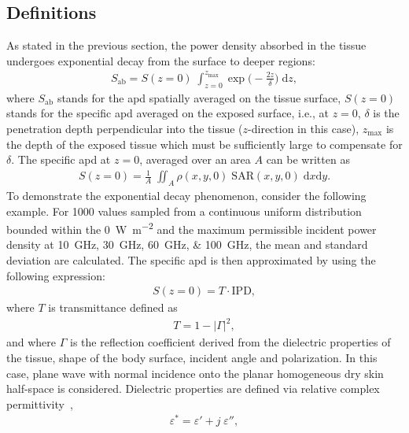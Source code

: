 \subsection{Definitions}
As stated in the previous section, the power density absorbed in the tissue undergoes exponential decay from the surface to deeper regions:
\begin{align}
    \label{eqn:apd}
    S_\text{ab} = S(z=0) \; \int_{z=0}^{z_\text{max}} \exp{ \Big(- \frac{2z}{\delta} \Big)} \; \mathrm{d}z,  
\end{align}
where $S_\text{ab}$ stands for the \gls{apd} spatially averaged on the tissue surface, $S(z=0)$ stands for the specific \gls{apd} averaged on the exposed surface, i.e., at $z=0$, $\delta$ is the penetration depth perpendicular into the tissue ($z$-direction in this case), $z_\text{max}$ is the depth of the exposed tissue which must be sufficiently large to compensate for $\delta$.
The specific \gls{apd} at $z=0$, averaged over an area $A$ can be written as
\begin{align}
    \label{eqn:specific_apd}
    S(z=0) = \frac{1}{A} \; \iint_A \rho(x, y, 0) \; \text{SAR}(x, y, 0) \; \mathrm{d}x \mathrm{d}y.
\end{align}
To demonstrate the exponential decay phenomenon, consider the following example.
For 1000 values sampled from a continuous uniform distribution bounded within the \SI{0}{\watt\per\m\squared} and the maximum permissible incident power density at \SIlist[list-units=single]{10;30;60;100}{\GHz}, the mean and standard deviation are calculated.
The specific \gls{apd} is then approximated by using the following expression:
\begin{align}
    \label{eqn:specific_apd_approx}
    S(z=0) = T \cdot \text{IPD},
\end{align}
where $T$ is transmittance defined as
\begin{align}
    \label{eqn:transmittance}
    T = 1 - |\Gamma|^2,
\end{align}
and where $\Gamma$ is the reflection coefficient derived from the dielectric properties of the tissue, shape of the body surface, incident angle and polarization.
In this case, plane wave with normal incidence onto the planar homogeneous dry skin half-space is considered.
Dielectric properties are defined via relative complex permittivity~\cite{Wu2015human},
\begin{align}
    \label{eqn:rel_complex_permittivity}
    \varepsilon^* = \varepsilon' + j \; \varepsilon'',
\end{align}
